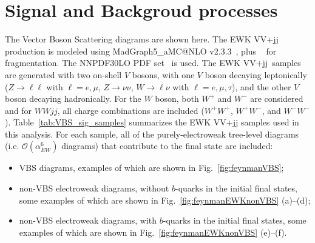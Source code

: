\chapter{Signal and Backgroud processes}

The Vector Boson Scattering diagrams are shown here.
The EWK VV+jj production is modeled using MadGraph5\_aMC@NLO v2.3.3~\cite{Alwall:2014hca},
plus ~\cite{Sjostrand:2007gs} for fragmentation.
The \textsc{NNPDF30LO} PDF set~\cite{Ball:2012cx} is used.
The EWK VV+jj\ samples are generated with two on-shell $V$ bosons, with one $V$ boson decaying leptonically
($Z\to \ell\ell$ with $\ell = e, \mu$, $Z\to \nu\nu$, $W\to \ell \nu$ with $\ell= e, \mu, \tau$),
and the other $V$ boson decaying hadronically.
For the $W$ boson, both $W^{+}$ and $W^{-}$ are considered and for $WWjj$, all charge combinations are included
($W^{+}W^{+}$, $W^{+}W^{-}$, and $W^{-}W^{-}$).
Table~\ref{tab:VBS_sig_samples} summarizes the EWK VV+jj samples used in this analysis.
For each sample, all of the purely-electroweak tree-level diagrams (i.e. $\mathcal{O}(\alpha_{EW}^6)$ diagrams)
that contribute to the final state are included:
\begin{itemize}
  \item VBS diagrams, examples of which are shown in Fig.~\ref{fig:feynmanVBS};
  \item non-VBS electroweak diagrams, without $b$-quarks in the initial final states, some examples of which are shown in Fig.~\ref{fig:feynmanEWKnonVBS} (a)--(d);
  \item non-VBS electroweak diagrams, with $b$-quarks in the initial final states, some examples of which are shown in Fig.~\ref{fig:feynmanEWKnonVBS} (e)--(f).
\end{itemize}

